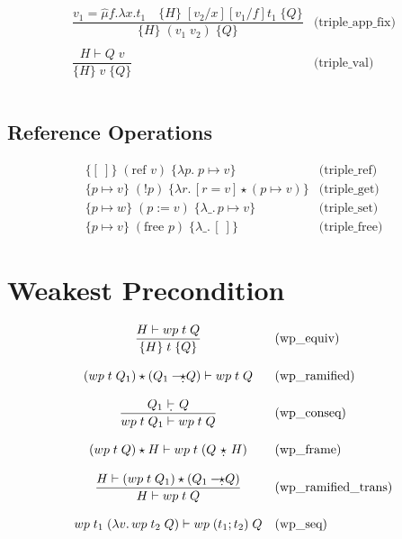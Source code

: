 \documentclass[10pt,a4paper]{article}
\newcommand{\emp}{[\: ]} %
\newcommand{\qwand}{-\!\!\text{\d{$\star$}}}
\newcommand{\qstar}{\text{ \d{$\star$} }} %
\newcommand{\himpl}{\vdash}
\newcommand{\qimpl}{\text{ \d{$\vdash$} }}
\newcommand{\triple}[3]{\{#2\}\;#1\;\{#3\}}
\begin{document}
\begin{multicols}{2}
\[\begin{array}{cl}
\dfrac{v_1 = \hat{\mu}f.\lambda{x}.t_1 \quad \triple{[v_2/x][v_1/f]t_1}{H}{Q}}
{\triple{(v_1\;v_2)}{H}{Q}} & \text{(triple\_app\_fix)} \\
\\
\dfrac{H \himpl Q\;v}
  {\triple{v}{H}{Q}} & \text{(triple\_val)} \\
  \\
\end{array}
\]

\subsection*{Reference Operations}

\[
 \begin{array}{ll}
\triple{(\text{ref }v)}{\emp}{\lambda p.\;p \mapsto v} & \text{(triple\_ref)}\\
   \triple{(!p)}{p \mapsto v}{\lambda r.\,[r = v] \star (p \mapsto v)} & \text{(triple\_get)} \\
   \triple{(p := v)}{p \mapsto w}{\lambda\_.\,p \mapsto v} & \text{(triple\_set)} \\
   \triple{(\text{free }p)}{p \mapsto v}{\lambda\_.\,\emp} & \text{(triple\_free)}
\end{array}
\]

\section*{Weakest Precondition}


\[
\begin{array}{cl}
\dfrac{H \himpl wp\;t\;Q}
  { \triple{t}{H}{Q}} & \text{(wp\_equiv)} \\
  \\
  {(wp\;t\;Q_1) \star (Q_1 \qwand Q)}
  \himpl
  {wp\;t\;Q} & \text{(wp\_ramified)} \\
  \\

\dfrac{Q_1 \qimpl Q }
  {wp\;t\;Q_1 \himpl wp\;t\;Q} & \text{(wp\_conseq)} \\
  \\

  {(wp\;t\;Q) \star H}
  \himpl
  { wp\;t\;(Q \qstar H)} & \text{(wp\_frame)} \\
\\
\dfrac{H \himpl (wp\;t\;Q_1) \star (Q_1 \qwand Q)}
  {H \himpl wp\;t\;Q}  & \text{(wp\_ramified\_trans)} \\
  \\

  { wp\;t_1\;(\lambda v.\,wp\;t_2\;Q) }
  \himpl
  {wp\;(t_1; t_2)\;Q} & \text{(wp\_seq)} \\
  \\
  

\end{array}\]
\end{multicols}
\end{document}
